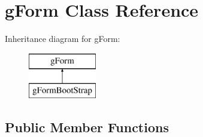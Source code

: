 \hypertarget{classg_form}{\section{g\-Form Class Reference}
\label{classg_form}
}
Inheritance diagram for g\-Form\-:\begin{figure}[H]
\begin{center}
\leavevmode
\includegraphics[height=2.000000cm]{classg_form}
\end{center}
\end{figure}
\subsection*{Public Member Functions}
